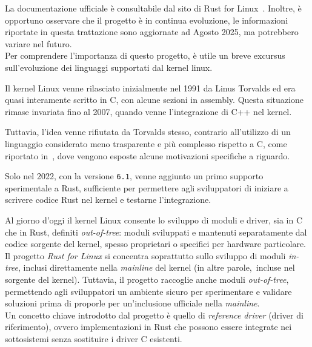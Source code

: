 La documentazione ufficiale è consultabile dal sito di Rust for Linux~\cite{rust-for-linux}. Inoltre, è opportuno osservare che il 
progetto è in continua evoluzione, le informazioni riportate in questa trattazione sono aggiornate ad Agosto 2025, ma potrebbero variare nel futuro. \hfill
\vspace{5pt} \\
\noindent Per comprendere l'importanza di questo progetto, è utile un breve excursus sull'evoluzione dei linguaggi supportati dal kernel linux.
\begin{framed}
\noindent Il kernel Linux venne rilasciato inizialmente nel 1991 da Linus Torvalds ed era quasi interamente scritto in C,
con alcune sezioni in assembly. Questa situazione rimase 
invariata fino al 2007, quando venne l'integrazione di
C++ nel kernel. 

Tuttavia, l'idea venne rifiutata da Torvalds stesso,
contrario all'utilizzo di un linguaggio considerato meno trasparente e più complesso rispetto a C,
 come riportato in~\cite{linus-cpp}, dove vengono esposte alcune motivazioni specifiche a riguardo.

 Solo nel 2022, con la versione \texttt{6.1}, venne aggiunto un primo supporto sperimentale a Rust, sufficiente per permettere agli sviluppatori
di iniziare a scrivere codice Rust nel kernel e testarne l'integrazione.
\end{framed}
\noindent Al giorno d'oggi il kernel Linux consente lo sviluppo di moduli e driver, sia
in C che in Rust, definiti \textit{out-of-tree}: moduli sviluppati e mantenuti separatamente dal codice sorgente del kernel,
spesso proprietari o specifici per hardware particolare. \hfill
\vspace{7pt} \\
\noindent Il progetto \textit{Rust for Linux} si concentra soprattutto sullo sviluppo di moduli \textit{in-tree}, inclusi direttamente nella \textit{mainline} del kernel (in altre parole,\  incluse nel sorgente del kernel).
Tuttavia, il progetto raccoglie anche moduli \textit{out-of-tree}, permettendo agli sviluppatori un ambiente sicuro per sperimentare e validare 
soluzioni prima di proporle per un'inclusione ufficiale nella \textit{mainline}.\hfill 
\vspace{15pt}\\
\noindent Un concetto chiave introdotto dal progetto è quello di \textit{reference driver} (driver di riferimento), ovvero implementazioni in Rust che possono essere integrate 
nei sottosistemi senza sostituire i driver C esistenti.

